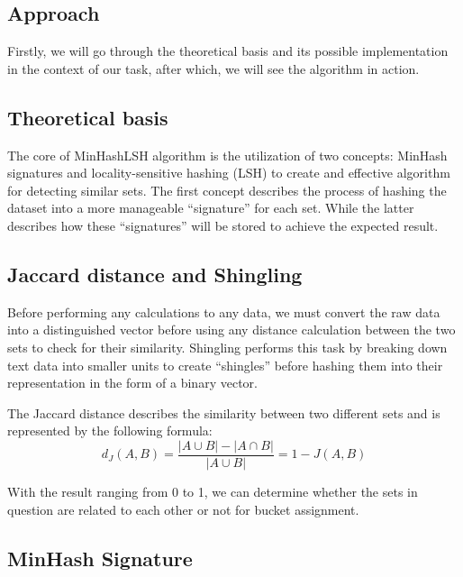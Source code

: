 \subsection{Approach}
\label{subsec:approach}

Firstly, we will go through the theoretical basis and its possible implementation
in the context of our task, after which, we will see the algorithm in action.

\subsection{Theoretical basis}
\label{subsec:theoretical-basis}

The core of MinHashLSH algorithm is the utilization of two concepts: MinHash signatures and locality-sensitive hashing (LSH) to create and effective algorithm for detecting similar sets.
The first concept describes the process of hashing the dataset into a more manageable ``signature'' for each set.
While the latter describes how these ``signatures'' will be stored to achieve the expected result.

\subsection{Jaccard distance and Shingling}
\label{subsec:jaccard-distance-and-shingling}

Before performing any calculations to any data, we must convert the raw data into a distinguished vector before using any distance calculation between the two sets to check for their similarity.
Shingling performs this task by breaking down text data into smaller units to create ``shingles'' before hashing them into their representation in the form of a binary vector.

The Jaccard distance describes the similarity between two different sets and is represented by the following formula:
\begin{equation}
    \label{eq:equation}
    d_J(A, B) = \frac{|A \cup B| - |A \cap B|}{|A \cup B|} = 1 - J(A, B)
\end{equation}

With the result ranging from 0 to 1, we can determine whether the sets in question are related to each other or not for bucket assignment.

\subsection{MinHash Signature}
\label{subsec:minhash-signature}

